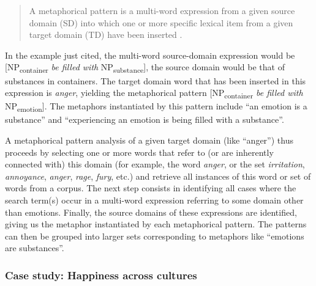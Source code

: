\begin{quotation}
A metaphorical pattern is a multi-word expression from a given source domain (SD) into which one or more specific lexical item from a given target domain (TD) have been inserted \citep[66]{stefanowitsch_words_2006}.
\end{quotation}

In the example just cited, the multi-word source-domain expression would be [NP\textsubscript{container} \textit{be filled with} NP\textsubscript{substance}], the source domain would be that of substances in containers. The target domain word that has been inserted in this expression is \textit{anger}, yielding the metaphorical pattern [NP\textsubscript{container} \textit{be filled with} NP\textsubscript{emotion}]. The metaphors instantiated by this pattern include ``an emotion is a substance'' and ``experiencing an emotion is being filled with a substance''.

A metaphorical pattern analysis of a given target domain (like ``anger'') thus proceeds by selecting one or more words that refer to (or are inherently connected with) this domain (for example, the word \textit{anger}, or the set \textit{irritation}, \textit{annoyance}, \textit{anger}, \textit{rage}, \textit{fury}, etc.) and retrieve all instances of this word or set of words from a corpus. The next step consists in identifying all cases where the search term(s) occur in a multi-word expression referring to some domain other than emotions. Finally, the source domains of these expressions are identified, giving us the metaphor instantiated by each metaphorical pattern. The patterns can then be grouped into larger sets corresponding to metaphors like ``emotions are substances''.


\subsubsection{Case study: Happiness across cultures}
\label{sec:happinessculture}

